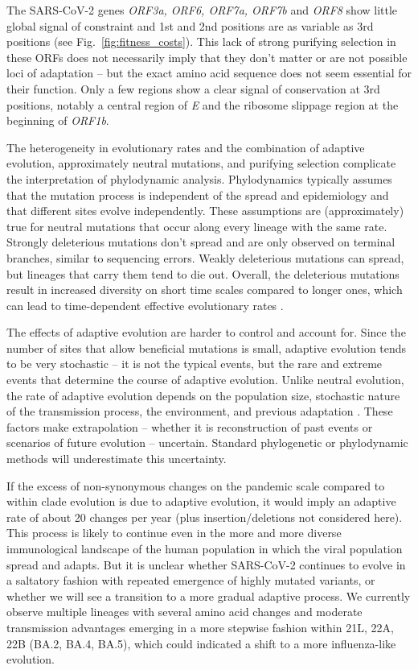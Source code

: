 \documentclass[aps,rmp, twocolumn]{revtex4}
\begin{document}
The SARS-CoV-2 genes \emph{ORF3a, ORF6, ORF7a, ORF7b} and \emph{ORF8} show little global signal of constraint and 1st and 2nd positions are as variable as 3rd positions (see Fig.~\ref{fig:fitness_costs}).
This lack of strong purifying selection in these ORFs does not necessarily imply that they don't matter or are not possible loci of adaptation -- but the exact amino acid sequence does not seem essential for their function.
Only a few regions show a clear signal of conservation at 3rd positions, notably a central region of \emph{E} and the ribosome slippage region at the beginning of \emph{ORF1b}.

The heterogeneity in evolutionary rates and the combination of adaptive evolution, approximately neutral mutations, and purifying selection complicate the interpretation of phylodynamic analysis.
Phylodynamics typically assumes that the mutation process is independent of the spread and epidemiology and that different sites evolve independently.
These assumptions are (approximately) true for neutral mutations that occur along every lineage with the same rate.
Strongly deleterious mutations don't spread and are only observed on terminal branches, similar to sequencing errors.
Weakly deleterious mutations can spread, but lineages that carry them tend to die out.
Overall, the deleterious mutations result in increased diversity on short time scales compared to longer ones, which can lead to time-dependent effective evolutionary rates \citep{wertheim_purifying_2011}.

The effects of adaptive evolution are harder to control and account for.
Since the number of sites that allow beneficial mutations is small, adaptive evolution tends to be very stochastic -- it is not the typical events, but the rare and extreme events that determine the course of adaptive evolution.
Unlike neutral evolution, the rate of adaptive evolution depends on the population size, stochastic nature of the transmission process, the environment, and previous adaptation \citep{neher_genetic_2013}.
These factors make extrapolation -- whether it is reconstruction of past events or scenarios of future evolution -- uncertain.
Standard phylogenetic or phylodynamic methods will underestimate this uncertainty.

If the excess of non-synonymous changes on the pandemic scale compared to within clade evolution is due to adaptive evolution, it would imply an adaptive rate of about 20 changes per year (plus insertion/deletions not considered here).
This process is likely to continue even in the more and more diverse immunological landscape of the human population in which the viral population spread and adapts.
But it is unclear whether SARS-CoV-2 continues to evolve in a saltatory fashion with repeated emergence of highly mutated variants, or whether we will see a transition to a more gradual adaptive process.
We currently observe multiple lineages with several amino acid changes and moderate transmission advantages emerging in a more stepwise fashion within 21L, 22A, 22B (BA.2, BA.4, BA.5), which could indicated a shift to a more influenza-like evolution.
\end{document}
